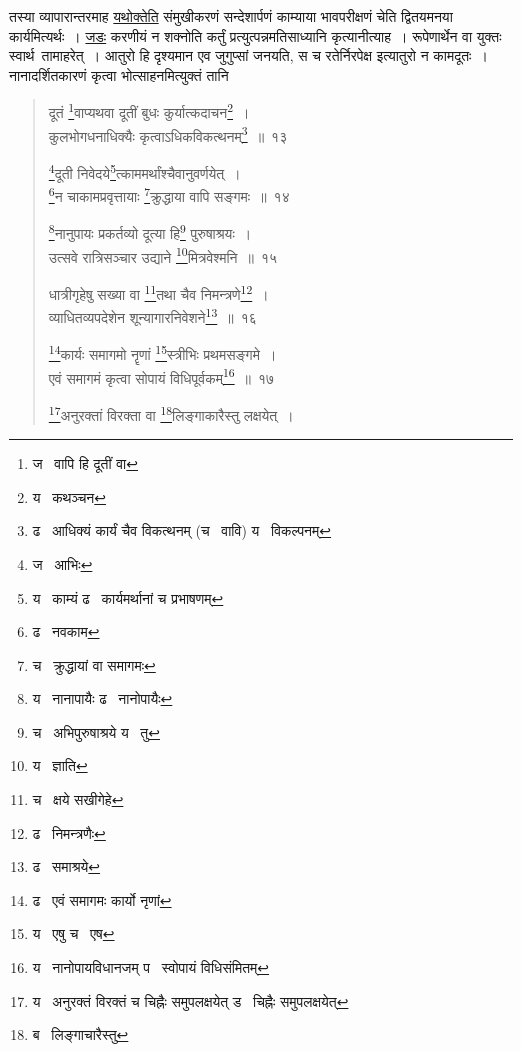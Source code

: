 \documentclass[11pt, openany]{book}
\begin{document}
तस्या व्यापारान्तरमाह \underline{यथोक्तेति} संमुखीकरणं सन्देशार्पणं काम्याया भावपरीक्षणं चेति द्वितयमनया कार्यमित्यर्थः~। \underline{जडः} करणीयं न शक्नोति कर्तुं प्रत्युत्पन्नमतिसाध्यानि कृत्यानीत्याह~। रूपेणार्थेन वा युक्तः स्वार्थ\textendash\ तामाहरेत्~। आतुरो हि दृश्यमान एव जुगुप्सां जनयति, स च रतेर्निरपेक्ष इत्यातुरो न कामदूतः~। नानादर्शितकारणं कृत्वा भोत्साहनमित्युक्तं तानि

\newpage

\begin{quote}
{\na दूतं \renewcommand{\thefootnote}{1}\footnote{ज \textendash\  वापि हि दूतीं वा}वाप्यथवा दूतीं बुधः कुर्यात्कदाचन\renewcommand{\thefootnote}{2}\footnote{य \textendash\  कथञ्चन}~।\\
कुलभोगधनाधिक्यैः कृत्वाऽधिकविकत्थनम्\renewcommand{\thefootnote}{3}\footnote{ढ \textendash\  आधिक्यं कार्यं चैव विकत्थनम् (च \textendash\  वावि) य \textendash\  विकल्पनम्}~॥~१३

\renewcommand{\thefootnote}{4}\footnote{ज \textendash\  आभिः}दूती निवेदये\renewcommand{\thefootnote}{5}\footnote{य \textendash\  काम्यं ढ \textendash\  कार्यमर्थानां च प्रभाषणम्}त्काममर्थांश्चैवानुवर्णयेत्~।\\
\renewcommand{\thefootnote}{6}\footnote{ढ \textendash\  नवकाम}न चाकामप्रवृत्तायाः \renewcommand{\thefootnote}{7}\footnote{च \textendash\  क्रुद्धायां वा समागमः}क्रुद्धाया वापि सङ्गमः~॥~१४ 

\renewcommand{\thefootnote}{8}\footnote{य \textendash\  नानापायैः ढ \textendash\  नानोपायैः}नानुपायः प्रकर्तव्यो दूत्या हि\renewcommand{\thefootnote}{9}\footnote{च \textendash\  अभिपुरुषाश्रये य \textendash\  तु} पुरुषाश्रयः~। \\
उत्सवे रात्रिसञ्चार उद्याने \renewcommand{\thefootnote}{10}\footnote{य \textendash\  ज्ञाति}मित्रवेश्मनि~॥~१५ 

धात्रीगृहेषु सख्या वा \renewcommand{\thefootnote}{11}\footnote{च \textendash\  क्षये सखीगेहे}तथा चैव निमन्त्रणे\renewcommand{\thefootnote}{12}\footnote{ढ \textendash\  निमन्त्रणैः}~।\\
व्याधितव्यपदेशेन शून्यागारनिवेशने\renewcommand{\thefootnote}{13}\footnote{ढ \textendash\  समाश्रये}~॥~१६

\renewcommand{\thefootnote}{14}\footnote{ढ \textendash\  एवं समागमः कार्यो नृणां}कार्यः समागमो नॄणां \renewcommand{\thefootnote}{15}\footnote{य \textendash\  एषु च \textendash\  एष}स्त्रीभिः प्रथमसङ्गमे~।\\
एवं समागमं कृत्वा सोपायं विधिपूर्वकम्\renewcommand{\thefootnote}{16}\footnote{य \textendash\  नानोपायविधानजम् प \textendash\  स्वोपायं विधिसंमितम्}~॥~१७ 

\renewcommand{\thefootnote}{17}\footnote{य \textendash\  अनुरक्तं विरक्तं च चिह्नैः समुपलक्षयेत् ड \textendash\  चिह्नैः समुपलक्षयेत्}अनुरक्तां विरक्ता वा \renewcommand{\thefootnote}{18}\footnote{ब \textendash\  लिङ्गाचारैस्तु}लिङ्गाकारैस्तु लक्षयेत्~।}
\end{quote}
\end{document}

